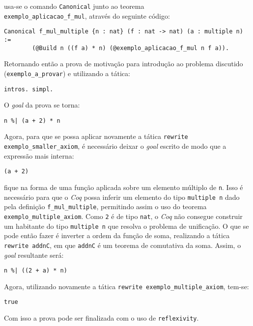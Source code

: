  usa-se o comando \lstinline[language = coq]!Canonical! junto ao teorema\\ 
 \lstinline[language = coq]!exemplo_aplicacao_f_mul!, através do seguinte código:
\begin{lstlisting}[language = coq]
    Canonical f_mul_multiple {n : nat} (f : nat -> nat) (a : multiple n) := 
        (@Build n ((f a) * n) (@exemplo_aplicacao_f_mul n f a)).
\end{lstlisting} 
    Retornando então a prova de motivação para introdução ao problema discutido\\
    (\lstinline[language = coq]!exemplo_a_provar!) e utilizando a tática:
\begin{lstlisting}[language = coq]
    intros. simpl.
\end{lstlisting} 
O \textit{goal} da prova se torna:
\begin{lstlisting}[language = coq]
    n %| (a + 2) * n
\end{lstlisting}
Agora, para que se possa aplicar novamente a tática \lstinline[language = coq]!rewrite exemplo_smaller_axiom!, é necessário deixar o \textit{goal} escrito de modo que a expressão mais interna:
\begin{lstlisting}[language = coq]
    (a + 2)
\end{lstlisting}
fique na forma de uma função aplicada sobre um elemento múltiplo de \lstinline[language = coq]!n!.
Isso é necessário para que o \textit{Coq} possa inferir um elemento do tipo \lstinline[language = coq]!multiple n! dado pela definição \lstinline[language = coq]!f_mul_multiple!, permitindo assim o uso do teorema \lstinline[language = coq]!exemplo_multiple_axiom!. Como \lstinline[language = coq]!2! é de tipo \lstinline[language = coq]!nat!, o \textit{Coq} não consegue construir um habitante do tipo \lstinline[language = coq]!multiple n! que resolva o problema de unificação. O que se pode então fazer é inverter a ordem da função de soma, realizando a tática \lstinline[language = coq]!rewrite addnC!, em que \lstinline[language = coq]!addnC! é um teorema de comutativa da soma. Assim, o \textit{goal} resultante será:
\begin{lstlisting}[language = coq]
    n %| ((2 + a) * n)
\end{lstlisting}
Agora, utilizando novamente a tática \lstinline[language = coq]!rewrite exemplo_multiple_axiom!, tem-se:
\begin{lstlisting}[language = coq]
    true
\end{lstlisting}
Com isso a prova pode ser finalizada com o uso de 
\lstinline[language = coq]!reflexivity!.